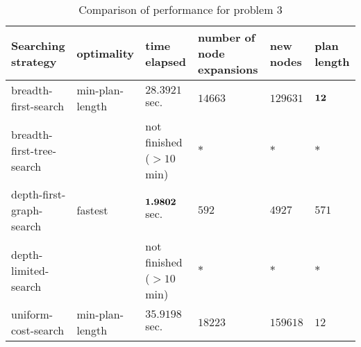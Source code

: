 \documentclass[11pt]{article}
\begin{document}
\begin{table*}[h]
 \footnotesize 
 \centering
\begin{tabular*}{0.995\textwidth}{|m{97pt}<{\centering}|m{60pt}<{\centering}|m{60pt}<{\centering}|m{60pt}<{\centering}|m{60pt}<{\centering}|m{60pt}<{\centering}|}
\hline 
Searching strategy & optimality & time elapsed  & number of node expansions &  new nodes & plan length \\ 
\hline 
\vspace{5pt} breadth-first-search \vspace{5pt} & min-plan-length  & ${28.3921}$ sec.  & $14663$ & $129631$  & $\boldsymbol{12}$ \\ 
\hline 
\vspace{5pt} breadth-first-tree-search \vspace{5pt} &  & not finished ($>10$ min) & $*$ & $*$  & $*$ \\ 
\hline 
\vspace{5pt} depth-first-graph-search \vspace{5pt} & fastest  & $\boldsymbol{1.9802}$ sec.  & $592$ & $4927$  & $571$ \\ 
\hline 
\vspace{5pt} depth-limited-search \vspace{5pt} &  & not finished ($>10$ min) & $*$ & $*$  & $*$ \\ 
\hline 
\vspace{5pt} uniform-cost-search \vspace{5pt} & min-plan-length  & $35.9198$ sec.  & $18223$ & $159618$  & $12$ \\ 
\hline 
\end{tabular*} \vspace{-5pt}
\caption{\footnotesize Comparison of performance for problem $3$} 
\label{tab: p3}
\end{table*}
\end{document}
